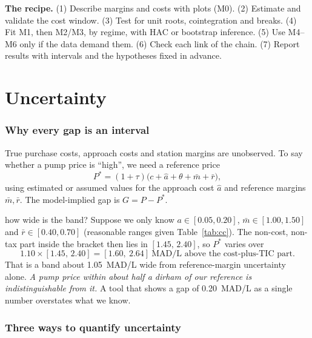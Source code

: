 \documentclass[11pt,a4paper]{article}
\theoremstyle{definition}
\begin{document}
\begin{keyidea}
\textbf{The recipe.} (1) Describe margins and costs with plots (M0). (2) Estimate and validate the cost window. (3) Test for unit roots, cointegration and breaks. (4) Fit M1, then M2/M3, by regime, with HAC or bootstrap inference. (5) Use M4--M6 only if the data demand them. (6) Check each link of the chain. (7) Report results with intervals and the hypotheses fixed in advance.
\end{keyidea}

\part{Uncertainty}

\section{Why every gap is an interval}

True purchase costs, approach costs and station margins are unobserved. To say whether a pump price is ``high'', we need a reference price
\begin{equation}\label{eq:pstar}
P^{\ast} = (1+\tau)\big(c + \hat a + \theta + \bar m + \bar r\big),
\end{equation}
using estimated or assumed values for the approach cost $\hat a$ and reference margins $\bar m,\bar r$. The model-implied gap is $G = P - P^{\ast}$.

\begin{worked}{how wide is the band?}
Suppose we only know $a\in[0.05,0.20]$, $\bar m\in[1.00,1.50]$ and $\bar r\in[0.40,0.70]$ (reasonable ranges given Table~\ref{tab:cc}). The non-cost, non-tax part inside the bracket then lies in
$[1.45,\,2.40]$, so $P^{\ast}$ varies over
\[
1.10\times[1.45,\,2.40] = [1.60,\ 2.64]\ \text{MAD/L above the cost-plus-TIC part}.
\]
That is a band about 1.05~MAD/L wide from reference-margin uncertainty alone. \emph{A pump price within about half a dirham of our reference is indistinguishable from it.} A tool that shows a gap of 0.20~MAD/L as a single number overstates what we know.
\end{worked}

\section{Three ways to quantify uncertainty}
\end{document}
